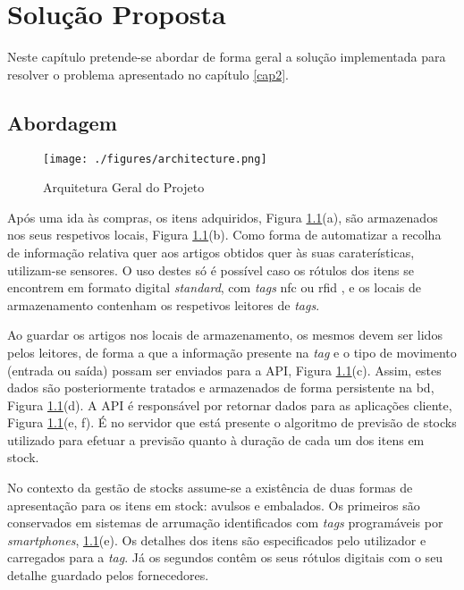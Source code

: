 %
%
\chapter{Solução Proposta} \label{cap3}

Neste capítulo pretende-se abordar de forma geral a solução implementada para resolver o problema apresentado no capítulo \ref{cap2}.

%
%
\section{Abordagem}\label{sec31}

\begin{figure}[H]
	\centering
	\texttt{[image: ./figures/architecture.png]}
	\caption{Arquitetura Geral do Projeto}
	\label{project-general-architecture}
\end{figure}

Após uma ida às compras, os itens adquiridos, Figura \ref{project-general-architecture}(a), são armazenados nos seus respetivos locais, Figura \ref{project-general-architecture}(b). Como forma de automatizar a recolha de informação relativa quer aos artigos obtidos quer às suas caraterísticas, utilizam-se sensores. O uso destes só é possível caso os rótulos dos itens se encontrem em formato digital \textit{standard}, com \textit{tags} \acrfull{nfc} \cite{nfcforum:nfc} ou \acrfull{rfid} \cite{rfidinc:rfid}, e os locais de armazenamento contenham os respetivos leitores de \textit{tags}.

Ao guardar os artigos nos locais de armazenamento, os mesmos devem ser lidos pelos leitores, de forma a que a informação presente na \textit{tag} e o tipo de movimento (entrada ou saída) possam ser enviados para a API, Figura \ref{project-general-architecture}(c). Assim, estes dados são posteriormente tratados e armazenados de forma persistente na \acrfull{bd}, Figura \ref{project-general-architecture}(d). A API é responsável por retornar dados para as aplicações cliente, Figura \ref{project-general-architecture}(e, f). É no servidor que está presente o algoritmo de previsão de stocks utilizado para efetuar a previsão quanto à duração de cada um dos itens em stock.

No contexto da gestão de stocks assume-se a existência de duas formas de apresentação para os itens em stock: avulsos e embalados. Os primeiros são conservados em sistemas de arrumação identificados com \textit{tags} programáveis por \textit{smartphones}, \ref{project-general-architecture}(e). Os detalhes dos itens são especificados pelo utilizador e carregados para a \textit{tag}. Já os segundos contêm os seus rótulos digitais com o seu detalhe guardado pelos fornecedores.\\

